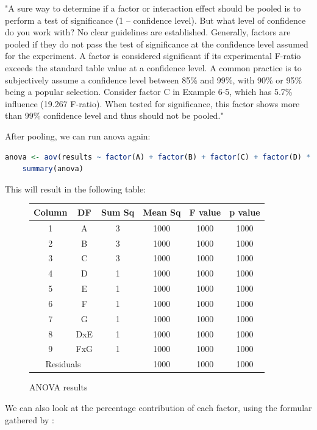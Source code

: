 "A sure way to determine if a factor or interaction effect should be pooled is to perform a test of significance (1 – confidence level). But what level of confidence do you work with? No clear guidelines are established. Generally, factors are pooled if they do not pass the test of significance at the confidence level assumed for the experiment. A factor is considered significant if its experimental F-ratio exceeds the standard table value at a confidence level. A common practice is to subjectively assume a confidence level between 85\% and 99\%, with 90\% or 95\% being a popular selection. Consider factor C in Example 6-5, which has 5.7\% influence (19.267 F-ratio). When tested for significance, this factor shows more than 99\% confidence level and thus should not be pooled."\cite{roy_primer_1990}

After pooling, we can run anova again:
\begin{lstlisting}[language=R]
	anova <- aov(results ~ factor(A) + factor(B) + factor(C) + factor(D) * factor(E) + factor(F) * factor(G), data = taguchi.combined_pivoted)
	summary(anova)
\end{lstlisting}

This will result in the following table:

\begin{figure}[H]
	\centering
	\begin{tabular}{ |cccccc|  }
		\hline
		Column 		& DF & Sum Sq & Mean Sq & F value & p value\\
		\hline
		1  & A 		& 3 & 1000 & 1000 & 1000\\
		2  & B 		& 3 & 1000 & 1000 & 1000\\
		3  & C 		& 3 & 1000 & 1000 & 1000\\
		4  & D 		& 1 & 1000 & 1000 & 1000\\
		5  & E 		& 1 & 1000 & 1000 & 1000\\
		6  & F 		& 1 & 1000 & 1000 & 1000\\
		7  & G 		& 1 & 1000 & 1000 & 1000\\
		8  & DxE 	& 1 & 1000 & 1000 & 1000\\
		9  & FxG 	& 1 & 1000 & 1000 & 1000\\
		\hline
		\multicolumn{2}{|c}{Residuals} &  & 1000 & 1000 & 1000\\
		\hline
	\end{tabular}
	\caption{ANOVA results}
\end{figure}



We can also look at the percentage contribution of each factor, using the formular gathered by \cite{yang_design_2009}:

